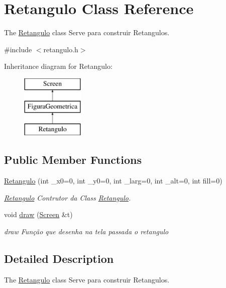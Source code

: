 \hypertarget{class_retangulo}{}\section{Retangulo Class Reference}
\label{class_retangulo}


The \mbox{\hyperlink{class_retangulo}{Retangulo}} class Serve para construir Retangulos.  




{\ttfamily \#include $<$retangulo.\+h$>$}

Inheritance diagram for Retangulo\+:\begin{figure}[H]
\begin{center}
\leavevmode
\includegraphics[height=3.000000cm]{class_retangulo}
\end{center}
\end{figure}
\subsection*{Public Member Functions}
\begin{DoxyCompactItemize}
\item 
\mbox{\hyperlink{class_retangulo_a8aa0361c5e9fb4c0df3a000858f51d8a}{Retangulo}} (int \+\_\+x0=0, int \+\_\+y0=0, int \+\_\+larg=0, int \+\_\+alt=0, int fill=0)
\begin{DoxyCompactList}\small\item\em \mbox{\hyperlink{class_retangulo}{Retangulo}} Contrutor da Class \mbox{\hyperlink{class_retangulo}{Retangulo}}. \end{DoxyCompactList}\item 
void \mbox{\hyperlink{class_retangulo_ac088dd6d3f4f3d3f80363a868c2e74f1}{draw}} (\mbox{\hyperlink{class_screen}{Screen}} \&t)
\begin{DoxyCompactList}\small\item\em draw Função que desenha na tela passada o retangulo \end{DoxyCompactList}\end{DoxyCompactItemize}


\subsection{Detailed Description}
The \mbox{\hyperlink{class_retangulo}{Retangulo}} class Serve para construir Retangulos. 

